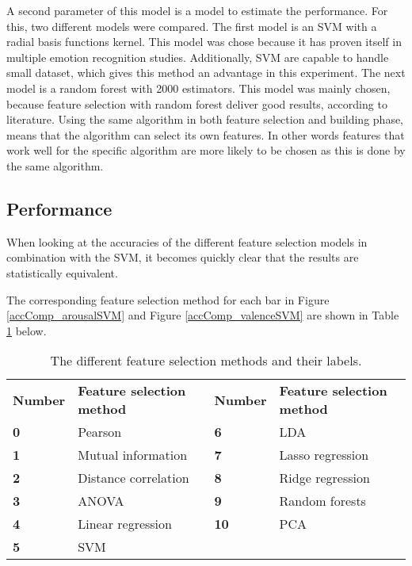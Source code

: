 \npar
A second parameter of this model is a model to estimate the performance. For this, two different models were compared. The first model is an SVM with a radial basis functions kernel. This model was chose because it has proven itself in multiple emotion recognition studies. Additionally, SVM are capable to handle small dataset, which gives this method an advantage in this experiment. The next model is a random forest with 2000 estimators. This model was mainly chosen, because feature selection with random forest deliver good results, according to literature\citep{rfPaper}. Using the same algorithm in both feature selection and building phase, means that the algorithm can select its own features. In other words features that work well for the specific algorithm are more likely to be chosen as this is done by the same algorithm.

\clearpage

\subsection{Performance}

When looking at the accuracies of the different feature selection models in combination with the SVM, it becomes quickly clear that the results are statistically equivalent. 

The corresponding feature selection method for each bar in Figure \ref{accComp_arousalSVM} and Figure \ref{accComp_valenceSVM} are shown in Table \ref{accCompLbl} below.

\begin{table}[H]
\centering
\begin{tabular}{ll|ll}
\textbf{Number} & \textbf{Feature selection method} & \textbf{Number} & \textbf{Feature selection method} \\
\textbf{0}      & Pearson                           & \textbf{6}      & LDA                      \\
\textbf{1}      & Mutual information                & \textbf{7}      & Lasso regression         \\
\textbf{2}      & Distance correlation              & \textbf{8}      & Ridge regression         \\
\textbf{3}      & ANOVA                             & \textbf{9}      & Random forests           \\
\textbf{4}      & Linear regression                 & \textbf{10}     & PCA                      \\
\textbf{5}      & SVM                      &        &                         
\end{tabular}
\caption{The different feature selection methods and their labels\label{accCompLbl}.}
\end{table}

